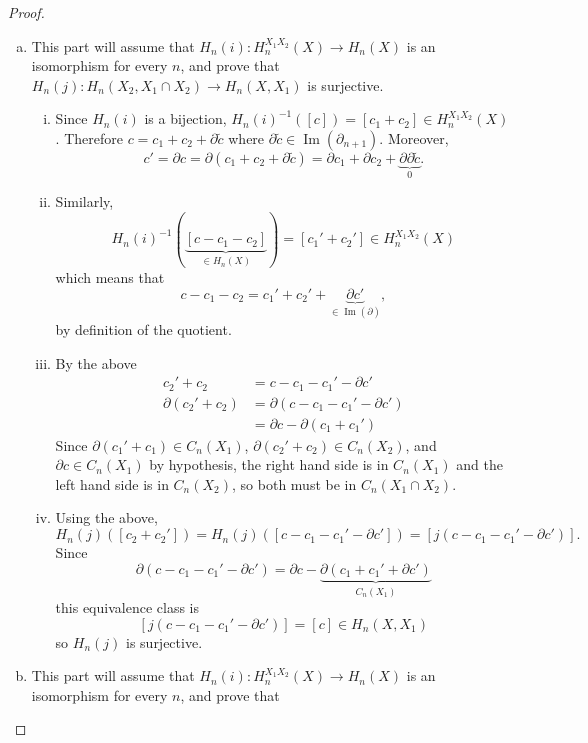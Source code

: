 \documentclass{article}
\newcommand{\fn}[3]{#1 \colon #2 \rightarrow #3}
\newcommand{\inv}[1]{#1^{-1}}
\DeclareMathOperator{\im}{Im}
\begin{document}
\begin{proof} \text{} \\
  \begin{enumerate}[a.]
    \item This part will assume that $\fn{H_n(i)}{H_n^{X_1X_2}(X)}{H_n(X)}$ is
    an isomorphism for every $n$, and prove that
    $\fn{H_n(j)}{H_n(X_2,X_1 \cap X_2)}{H_n(X, X_1)}$ is surjective.
    \begin{enumerate}[(i)]
      \item Since $H_n(i)$ is a bijection, $\inv{H_n(i)}([c]) = [c_1 + c_2] \in H_n^{X_1X_2}(X)$. Therefore $c = c_1 + c_2 + \partial \tilde c$ where $\partial\tilde c \in \im(\partial_{n+1})$.
      Moreover, \[
        c'
        = \partial c
        = \partial(c_1 + c_2 + \partial\tilde c)
        = \partial c_1 + \partial c_2 + \underbrace{\partial\partial\tilde c}_0.
      \]
      \item Similarly, \[
        \inv{H_n(i)}(\underbrace{[c - c_1 - c_2]}_{\in H_n(X)}) = [c_1' + c_2'] \in H_n^{X_1X_2}(X)
      \] which means that \[
        c - c_1 - c_2 = c_1' + c_2' + \underbrace{\partial c'}_{\in \im(\partial)},
      \] by definition of the quotient.
      \item By the above \begin{align*}
        c_2' + c_2 &= c - c_1 - c_1' - \partial c' \\
        \partial(c_2' + c_2)
        &= \partial(c - c_1 - c_1' - \partial c') \\
        &= \partial c - \partial(c_1 + c_1')
      \end{align*} Since $\partial(c_1' + c_1) \in C_n(X_1)$,
      $\partial(c_2' + c_2) \in C_n(X_2)$, and
      $\partial c \in C_n(X_1)$ by hypothesis, the right hand side is in
      $C_n(X_1)$ and the left hand side is in $C_n(X_2)$, so both must be in
      $C_n(X_1 \cap X_2)$.
      \item Using the above, \[
        H_n(j)([c_2 + c_2'])
        = H_n(j)([c - c_1 - c_1' - \partial c'])
        = [j(c - c_1 - c_1' - \partial c')].
      \]
      Since
      \[
        \partial(c - c_1 - c_1' - \partial c')
        = \partial c - \underbrace{\partial(c_1 + c_1' + \partial c')}_{C_n(X_1)}
      \] this equivalence class is \[
        [j(c - c_1 - c_1' - \partial c')] = [c] \in H_n(X, X_1)
      \] so $H_n(j)$ is surjective.
    \end{enumerate}
    \item This part will assume that $\fn{H_n(i)}{H_n^{X_1X_2}(X)}{H_n(X)}$ is
    an isomorphism for every $n$, and prove that

\end{enumerate}
\end{proof}
\end{document}
